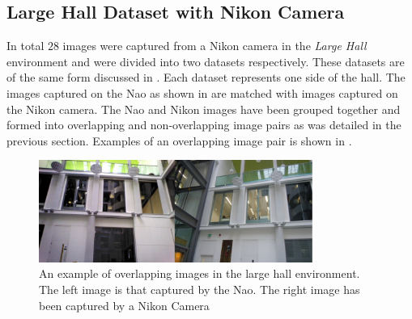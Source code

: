 \documentclass{report}
\begin{document}




\subsection{Large Hall Dataset with Nikon Camera}
\label{sec:nikonlargeHall}
In total $28$ images were captured from a Nikon camera in the \textit{Large Hall} environment and were divided into two datasets respectively. These datasets are of the same form discussed in . Each dataset represents one side of the hall. The images captured on the Nao as shown in  are matched with images captured on the Nikon camera. The Nao and Nikon images have been grouped together and formed into overlapping and non-overlapping image pairs as was detailed in the previous section. Examples of an overlapping image pair is shown in .\\

\begin{figure}[h!] 
  \centering
    \includegraphics[width=0.8\textwidth]{../Drawings/camera/comparelargeHall.jpg}
    \caption{An example of overlapping images in the large hall environment. The left image is that captured by the Nao. The right image has been captured by a Nikon Camera}
    \label{fig:cameraOverlaplargeHall}
\end{figure}
\end{document}
